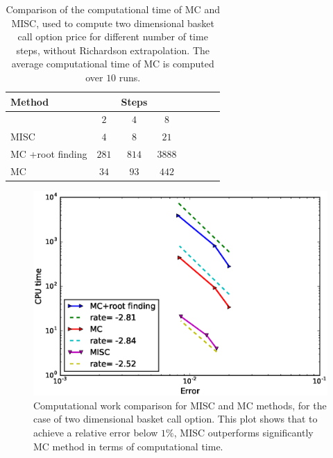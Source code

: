 \begin{table}[h!]
	\centering
	\begin{tabular}{l*{6}{c}r}
		\toprule[1.5pt]
	Method & & Steps  & &     \\
	\hline
	         & $2$ & $4$ & $8$    \\
		\hline
		MISC & $4$  & $8$ & $21$     \\
			MC +root finding  & $281$&  $814$&  $3888$   \\
				MC  &   $34$& $93$ &   $ 442$ \\
		\bottomrule[1.25pt]
	\end{tabular}
	\caption{Comparison of the computational time of  MC and MISC, used to compute two dimensional basket call option price  for different number of time steps, without Richardson extrapolation. The average computational time of MC is computed over $10$ runs.}
	\label{Comparsion of the computational time of  MC and MISC, used to compute two dim basket Call option price  for different number of time steps, without Richardson extrapolation}
\end{table}


\FloatBarrier
	\begin{figure}[h!]
\centering
\includegraphics[width=0.4\linewidth]{./figures/basket_call_2d_time_stepping/complexity_rates/error_vs_time}

\caption{Computational work comparison for MISC and MC methods, for the case of two dimensional basket call option. This plot shows that to achieve a relative error below $1\%$, MISC outperforms significantly MC method in terms of computational time.}
\label{fig:Complexity plot for MC and MISC , two dim basket call non rich}
\end{figure}


\FloatBarrier

